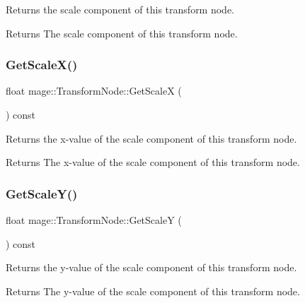 Returns the scale component of this transform node.

\begin{DoxyReturn}{Returns}
The scale component of this transform node. 
\end{DoxyReturn}
\hypertarget{classmage_1_1_transform_node_a465204839a047c6cddbb551a549da741}{}\label{classmage_1_1_transform_node_a465204839a047c6cddbb551a549da741} 
\subsubsection{\texorpdfstring{Get\+Scale\+X()}{GetScaleX()}}
{\footnotesize\ttfamily float mage\+::\+Transform\+Node\+::\+Get\+ScaleX (\begin{DoxyParamCaption}{ }\end{DoxyParamCaption}) const}

Returns the x-\/value of the scale component of this transform node.

\begin{DoxyReturn}{Returns}
The x-\/value of the scale component of this transform node. 
\end{DoxyReturn}
\hypertarget{classmage_1_1_transform_node_a8b4023dc2dd9a62012ee0aa36ec022b5}{}\label{classmage_1_1_transform_node_a8b4023dc2dd9a62012ee0aa36ec022b5} 
\subsubsection{\texorpdfstring{Get\+Scale\+Y()}{GetScaleY()}}
{\footnotesize\ttfamily float mage\+::\+Transform\+Node\+::\+Get\+ScaleY (\begin{DoxyParamCaption}{ }\end{DoxyParamCaption}) const}

Returns the y-\/value of the scale component of this transform node.

\begin{DoxyReturn}{Returns}
The y-\/value of the scale component of this transform node. 
\end{DoxyReturn}
\hypertarget{classmage_1_1_transform_node_afba2781f69e1abe50b9a2ad87f641439}{}\label{classmage_1_1_transform_node_afba2781f69e1abe50b9a2ad87f641439} 
